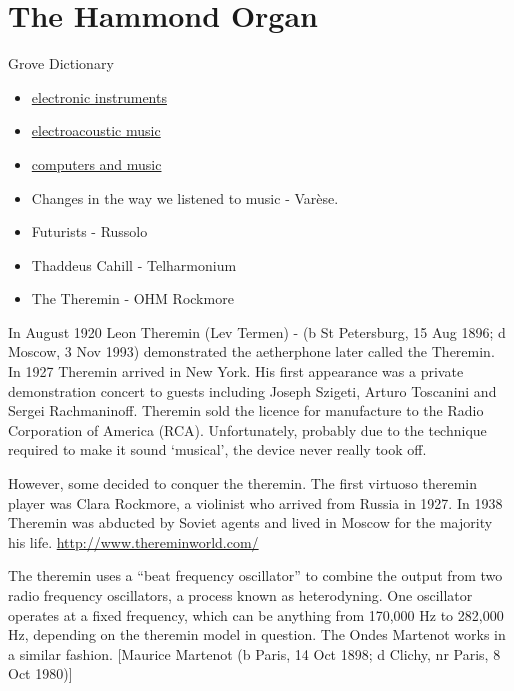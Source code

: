 \section{The Hammond Organ}


Grove Dictionary
\begin{itemize}
\item \href{http://www.grovemusic.com/shared/views/article.html?from=search&session_search_id=1011869954&session_name=e09647b5a66fbfeb&hitnum=1&section=music.08694&start=1&query=electronic%20instruments&search_subview=search_subject}{electronic instruments}
\item \href{http://www.grovemusic.com/shared/views/article.html?section=music.08695}{electroacoustic music}
\item \href{http://www.grovemusic.com/shared/views/article.html?section=music.40583}{computers and music}
\end{itemize}

\begin{itemize}
\item Changes in the way we listened to music - Var\`ese.
\item Futurists - Russolo
\item Thaddeus Cahill - Telharmonium
\item The Theremin - OHM Rockmore 

\end{itemize}

In August 1920 Leon Theremin (Lev Termen) - (b St Petersburg, 15 Aug 1896; d
Moscow, 3 Nov 1993) demonstrated the aetherphone later called the Theremin. In 1927
Theremin arrived in New York. His first appearance was a private demonstration concert
to guests including Joseph Szigeti, Arturo Toscanini and Sergei Rachmaninoff. Theremin
sold the licence for manufacture to the Radio Corporation of America (RCA).
Unfortunately, probably due to the technique required to make it sound ‘musical’, the
device never really took off.

However, some decided to conquer the theremin. The first virtuoso theremin player was
Clara Rockmore, a violinist who arrived from Russia in 1927. In 1938 Theremin was
abducted by Soviet agents and lived in Moscow for the majority his life.
\url{http://www.thereminworld.com/}

The theremin uses a ``beat frequency oscillator'' to combine the output from two radio
frequency oscillators, a process known as heterodyning. One oscillator operates at a fixed frequency,
which can be anything from 170,000 Hz to 282,000 Hz, depending on the theremin
model in question. The Ondes Martenot works in a similar fashion. [Maurice Martenot (b
Paris, 14 Oct 1898; d Clichy, nr Paris, 8 Oct 1980)]

